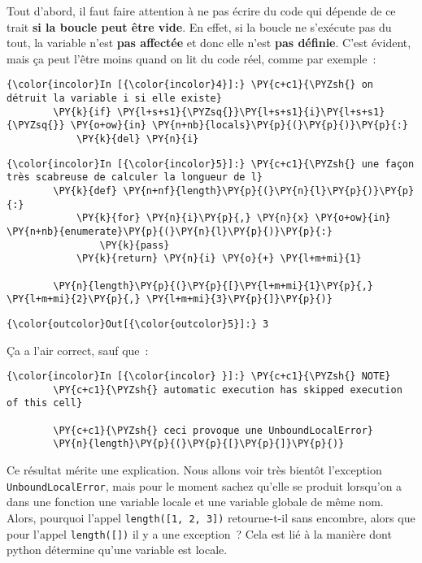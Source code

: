     Tout d'abord, il faut faire attention à ne pas écrire du code qui
dépende de ce trait \textbf{si la boucle peut être vide}. En effet, si
la boucle ne s'exécute pas du tout, la variable n'est \textbf{pas
affectée} et donc elle n'est \textbf{pas définie}. C'est évident, mais
ça peut l'être moins quand on lit du code réel, comme par exemple~:

    \begin{Verbatim}[commandchars=\\\{\}]
{\color{incolor}In [{\color{incolor}4}]:} \PY{c+c1}{\PYZsh{} on détruit la variable i si elle existe}
        \PY{k}{if} \PY{l+s+s1}{\PYZsq{}}\PY{l+s+s1}{i}\PY{l+s+s1}{\PYZsq{}} \PY{o+ow}{in} \PY{n+nb}{locals}\PY{p}{(}\PY{p}{)}\PY{p}{:} 
            \PY{k}{del} \PY{n}{i}   
\end{Verbatim}


    \begin{Verbatim}[commandchars=\\\{\}]
{\color{incolor}In [{\color{incolor}5}]:} \PY{c+c1}{\PYZsh{} une façon très scabreuse de calculer la longueur de l}
        \PY{k}{def} \PY{n+nf}{length}\PY{p}{(}\PY{n}{l}\PY{p}{)}\PY{p}{:}
            \PY{k}{for} \PY{n}{i}\PY{p}{,} \PY{n}{x} \PY{o+ow}{in} \PY{n+nb}{enumerate}\PY{p}{(}\PY{n}{l}\PY{p}{)}\PY{p}{:}
                \PY{k}{pass}
            \PY{k}{return} \PY{n}{i} \PY{o}{+} \PY{l+m+mi}{1}
        
        \PY{n}{length}\PY{p}{(}\PY{p}{[}\PY{l+m+mi}{1}\PY{p}{,} \PY{l+m+mi}{2}\PY{p}{,} \PY{l+m+mi}{3}\PY{p}{]}\PY{p}{)}
\end{Verbatim}


\begin{Verbatim}[commandchars=\\\{\}]
{\color{outcolor}Out[{\color{outcolor}5}]:} 3
\end{Verbatim}
            
    Ça a l'air correct, sauf que~:

    \begin{Verbatim}[commandchars=\\\{\}]
{\color{incolor}In [{\color{incolor} }]:} \PY{c+c1}{\PYZsh{} NOTE}
        \PY{c+c1}{\PYZsh{} automatic execution has skipped execution of this cell}
        
        \PY{c+c1}{\PYZsh{} ceci provoque une UnboundLocalError}
        \PY{n}{length}\PY{p}{(}\PY{p}{[}\PY{p}{]}\PY{p}{)}
\end{Verbatim}


    Ce résultat mérite une explication. Nous allons voir très bientôt
l'exception \texttt{UnboundLocalError}, mais pour le moment sachez
qu'elle se produit lorsqu'on a dans une fonction une variable locale et
une variable globale de même nom. Alors, pourquoi l'appel
\texttt{length({[}1,\ 2,\ 3{]})} retourne-t-il sans encombre, alors que
pour l'appel \texttt{length({[}{]})} il y a une exception~? Cela est lié
à la manière dont python détermine qu'une variable est locale.

